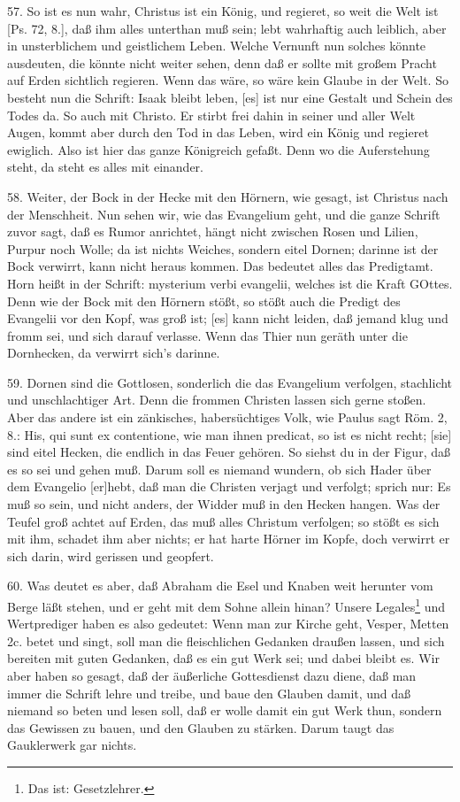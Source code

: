 57. So ist es nun wahr, Christus ist ein König, und regieret, so weit die Welt ist [Ps. 72, 8.], daß ihm alles unterthan muß sein; lebt wahrhaftig auch leiblich, aber in unsterblichem und geistlichem Leben. Welche Vernunft nun solches könnte ausdeuten, die könnte nicht weiter sehen, denn daß er sollte mit großem Pracht auf Erden sichtlich regieren. Wenn das wäre, so wäre kein Glaube in der Welt. So besteht nun die Schrift: Isaak bleibt leben, [es] ist nur eine Gestalt und Schein des Todes da. So auch mit Christo. Er stirbt frei dahin in seiner und aller Welt Augen, kommt aber durch den Tod in das Leben, wird ein König und regieret ewiglich. Also ist hier das ganze Königreich gefaßt. Denn wo die Auferstehung steht, da steht es alles mit einander.

58. Weiter, der Bock in der Hecke mit den Hörnern, wie gesagt, ist Christus nach der Menschheit. Nun sehen wir, wie das Evangelium geht, und die ganze Schrift zuvor sagt, daß es Rumor anrichtet, hängt nicht zwischen Rosen und Lilien, Purpur noch Wolle; da ist nichts Weiches, sondern eitel Dornen; darinne ist der Bock verwirrt, kann nicht heraus kommen. Das bedeutet alles das Predigtamt. Horn heißt in der Schrift: mysterium verbi evangelii, welches ist die Kraft GOttes. Denn wie der Bock mit den Hörnern stößt, so stößt auch die Predigt des Evangelii vor den Kopf, was groß ist; [es] kann nicht leiden, daß jemand klug und fromm sei, und sich darauf verlasse. Wenn das Thier nun geräth unter die Dornhecken, da verwirrt sich's darinne.

59. Dornen sind die Gottlosen, sonderlich die das Evangelium verfolgen, stachlicht und unschlachtiger
Art. Denn die frommen Christen lassen sich gerne stoßen. Aber das andere ist ein zänkisches, habersüchtiges Volk, wie Paulus sagt Röm. 2, 8.: His, qui sunt ex contentione, wie man ihnen predicat, so ist es nicht recht; [sie] sind eitel Hecken, die endlich in das Feuer gehören. So siehst du in der Figur, daß es so sei und gehen muß. Darum soll es niemand wundern, ob sich Hader über dem Evangelio [er]hebt, daß man die Christen verjagt und verfolgt; sprich nur: Es muß so sein, und nicht anders, der Widder muß in den Hecken hangen. Was der Teufel groß achtet auf Erden, das muß alles Christum verfolgen; so stößt es sich mit ihm, schadet ihm aber nichts; er hat harte Hörner im Kopfe, doch verwirrt er sich darin, wird gerissen und geopfert.

60. Was deutet es aber, daß Abraham die Esel und Knaben weit herunter vom Berge läßt stehen, und er geht mit dem Sohne allein hinan? Unsere Legales\footnote{Das ist: Gesetzlehrer.} und Wertprediger haben es also gedeutet: Wenn man zur Kirche geht, Vesper, Metten 2c. betet und singt, soll man die fleischlichen Gedanken draußen lassen, und sich bereiten mit guten Gedanken, daß es ein gut Werk sei; und dabei bleibt es. Wir aber haben so gesagt, daß der äußerliche Gottesdienst dazu diene, daß man immer die Schrift lehre und treibe, und baue den Glauben damit, und daß niemand so beten und lesen soll, daß er wolle damit ein gut Werk thun, sondern das Gewissen zu bauen, und den Glauben zu stärken. Darum taugt das Gauklerwerk gar nichts.

